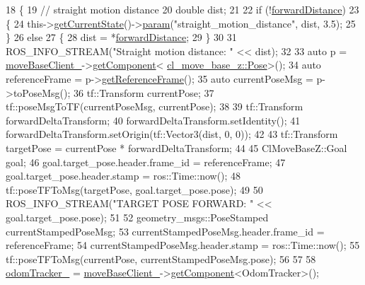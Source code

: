 \begin{DoxyCode}
18 \{
19     \textcolor{comment}{// straight motion distance}
20     \textcolor{keywordtype}{double} dist;
21 
22     \textcolor{keywordflow}{if} (!\hyperlink{classcl__move__base__z_1_1CbNavigateForward_a41bc9c319c64be6302f7365173ccd2c5}{forwardDistance})
23     \{
24         this->\hyperlink{classsmacc_1_1ISmaccClientBehavior_a34fde34e48fa13db622ee60d8374d0b8}{getCurrentState}()->\hyperlink{classsmacc_1_1ISmaccState_a4f2ff8e3eda8aa9bbb60c8ff17d0def1}{param}(\textcolor{stringliteral}{"straight\_motion\_distance"}, dist, 3.5);
25     \}
26     \textcolor{keywordflow}{else}
27     \{
28         dist = *\hyperlink{classcl__move__base__z_1_1CbNavigateForward_a41bc9c319c64be6302f7365173ccd2c5}{forwardDistance};
29     \}
30 
31     ROS\_INFO\_STREAM(\textcolor{stringliteral}{"Straight motion distance: "} << dist);
32 
33     \textcolor{keyword}{auto} p = \hyperlink{classcl__move__base__z_1_1CbMoveBaseClientBehaviorBase_ab2ef219464cfac8659b4a87c8d0db6d5}{moveBaseClient\_}->\hyperlink{classsmacc_1_1ISmaccClient_adef78db601749ca63c19e74a27cb88cc}{getComponent}<
      \hyperlink{classcl__move__base__z_1_1Pose}{cl\_move\_base\_z::Pose}>();
34     \textcolor{keyword}{auto} referenceFrame = p->\hyperlink{classcl__move__base__z_1_1Pose_af8c2dc151e74aa8da6b283d1c8563051}{getReferenceFrame}();
35     \textcolor{keyword}{auto} currentPoseMsg = p->toPoseMsg();
36     tf::Transform currentPose;
37     tf::poseMsgToTF(currentPoseMsg, currentPose);
38 
39     tf::Transform forwardDeltaTransform;
40     forwardDeltaTransform.setIdentity();
41     forwardDeltaTransform.setOrigin(tf::Vector3(dist, 0, 0));
42 
43     tf::Transform targetPose = currentPose * forwardDeltaTransform;
44 
45     ClMoveBaseZ::Goal goal;
46     goal.target\_pose.header.frame\_id = referenceFrame;
47     goal.target\_pose.header.stamp = ros::Time::now();
48     tf::poseTFToMsg(targetPose, goal.target\_pose.pose);
49 
50     ROS\_INFO\_STREAM(\textcolor{stringliteral}{"TARGET POSE FORWARD: "} << goal.target\_pose.pose);
51 
52     geometry\_msgs::PoseStamped currentStampedPoseMsg;
53     currentStampedPoseMsg.header.frame\_id = referenceFrame;
54     currentStampedPoseMsg.header.stamp = ros::Time::now();
55     tf::poseTFToMsg(currentPose, currentStampedPoseMsg.pose);
56 
57     
58     \hyperlink{classcl__move__base__z_1_1CbNavigateForward_a7583a4d669af48618bd45950db8e5292}{odomTracker\_} = \hyperlink{classcl__move__base__z_1_1CbMoveBaseClientBehaviorBase_ab2ef219464cfac8659b4a87c8d0db6d5}{moveBaseClient\_}->\hyperlink{classsmacc_1_1ISmaccClient_adef78db601749ca63c19e74a27cb88cc}{getComponent}<OdomTracker>();

\end{DoxyCode}

